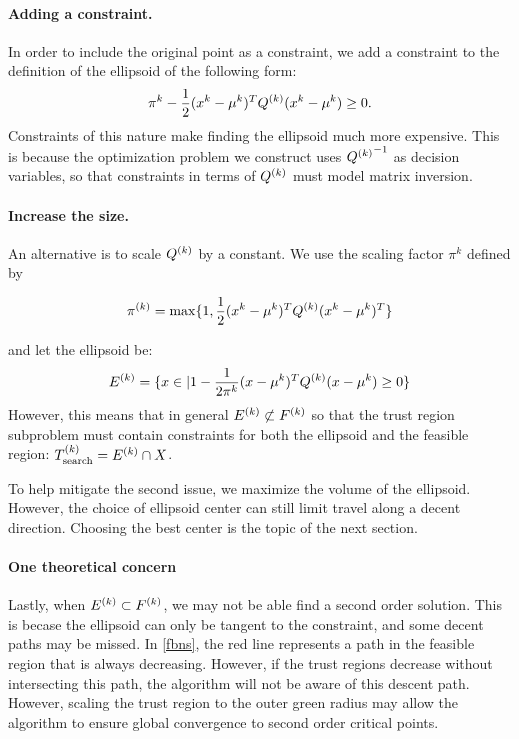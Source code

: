 
\paragraph{Adding a constraint.}
In order to include the original point as a constraint, we add a constraint to the definition of the ellipsoid of the following form:
$$ \pi^k - \frac 1 2 (x^k - \mu^{k})^T{Q^{(k)}}(x^k - \mu^{k}) \ge 0. $$
Constraints of this nature make finding the ellipsoid much more expensive.
This is because the optimization problem we construct uses ${{Q^{(k)}}}^{-1}$ as decision variables, so that constraints in terms of ${Q^{(k)}}$ must model matrix inversion.

\paragraph{Increase the size.}
An alternative is to scale ${Q^{(k)}}$ by a constant.
We use the scaling factor $\pi^k$ defined by

$$\pi^{(k)} = \max \{1, \frac 1 {2} (x^{k} - \mu^{k})^T {Q^{(k)}} (x^{k} - \mu^{k})^T \}$$

and let the ellipsoid be:
$${E^{(k)}} = \{x \in \mathbb | 1 - \frac 1 {2\pi^k} (x - \mu^{k})^T {Q^{(k)}} (x - \mu^{k}) \ge 0\} $$
However, this means that in general ${E^{(k)}} \not \subset {F}^{(k)}$ so that the trust region subproblem must contain constraints for both the ellipsoid and the feasible region: ${T_{\text{search}}^{(k)}} = {E^{(k)}} \cap X$.

To help mitigate the second issue, we maximize the volume of the ellipsoid.
However, the choice of ellipsoid center can still limit travel along a decent direction.
Choosing the best center is the topic of the next section.

\paragraph{One theoretical concern}




Lastly, when ${E^{(k)}} \subset {F}^{(k)}$, we may not be able find a second order solution.
This is becase the ellipsoid can only be tangent to the constraint, and some decent paths may be missed.
In \cref{fbns}, the red line represents a path in the feasible region that is always decreasing.
However, if the trust regions decrease without intersecting this path, the algorithm will not be aware of this descent path.
However, scaling the trust region to the outer green radius may allow the algorithm to ensure global convergence to second order critical points.


